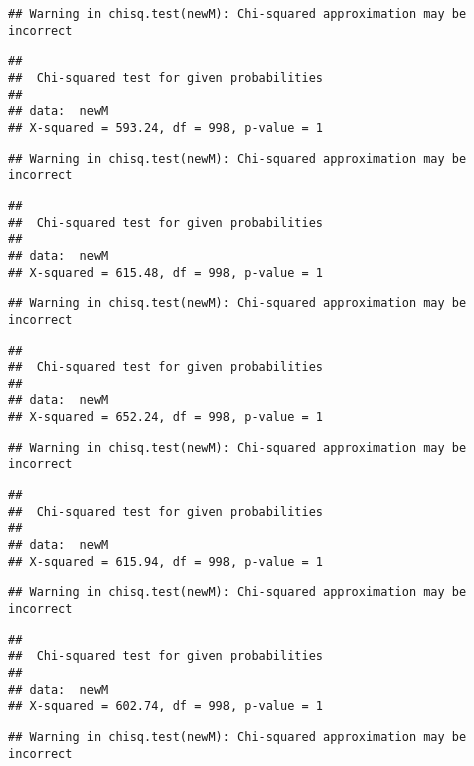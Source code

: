 \documentclass[]{article}
\begin{document}
\begin{verbatim}
## Warning in chisq.test(newM): Chi-squared approximation may be incorrect
\end{verbatim}

\begin{verbatim}
## 
##  Chi-squared test for given probabilities
## 
## data:  newM
## X-squared = 593.24, df = 998, p-value = 1
\end{verbatim}

\begin{verbatim}
## Warning in chisq.test(newM): Chi-squared approximation may be incorrect
\end{verbatim}

\begin{verbatim}
## 
##  Chi-squared test for given probabilities
## 
## data:  newM
## X-squared = 615.48, df = 998, p-value = 1
\end{verbatim}

\begin{verbatim}
## Warning in chisq.test(newM): Chi-squared approximation may be incorrect
\end{verbatim}

\begin{verbatim}
## 
##  Chi-squared test for given probabilities
## 
## data:  newM
## X-squared = 652.24, df = 998, p-value = 1
\end{verbatim}

\begin{verbatim}
## Warning in chisq.test(newM): Chi-squared approximation may be incorrect
\end{verbatim}

\begin{verbatim}
## 
##  Chi-squared test for given probabilities
## 
## data:  newM
## X-squared = 615.94, df = 998, p-value = 1
\end{verbatim}

\begin{verbatim}
## Warning in chisq.test(newM): Chi-squared approximation may be incorrect
\end{verbatim}

\begin{verbatim}
## 
##  Chi-squared test for given probabilities
## 
## data:  newM
## X-squared = 602.74, df = 998, p-value = 1
\end{verbatim}

\begin{verbatim}
## Warning in chisq.test(newM): Chi-squared approximation may be incorrect
\end{verbatim}
\end{document}
